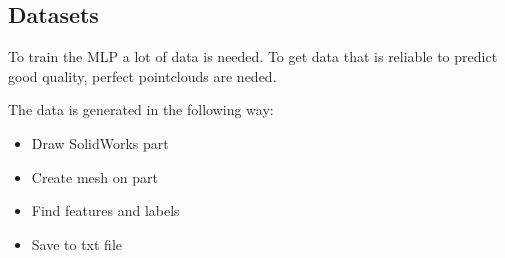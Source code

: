 \subsection{Datasets}

To train the MLP a lot of data is needed. To get data that is reliable to predict good quality, perfect pointclouds are neded.

The data is generated in the following way:
\begin{itemize}
    \item Draw SolidWorks part
    \item Create mesh on part
    \item Find features and labels
    \item Save to txt file
\end{itemize}


